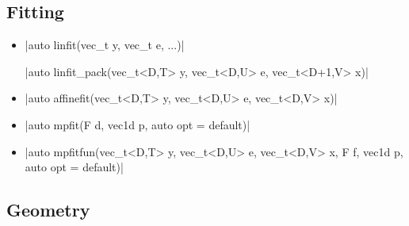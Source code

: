 \documentclass[12pt]{report}
\begin{document}
\subsection{Fitting}

\begin{itemize}
\item \cppinline|auto linfit(vec_t y, vec_t e, ...)| 

\cppinline|auto linfit_pack(vec_t<D,T> y, vec_t<D,U> e, vec_t<D+1,V> x)| 

\item \cppinline|auto affinefit(vec_t<D,T> y, vec_t<D,U> e, vec_t<D,V> x)| 

\item \cppinline|auto mpfit(F d, vec1d p, auto opt = default)| 

\item \cppinline|auto mpfitfun(vec_t<D,T> y, vec_t<D,U> e, vec_t<D,V> x, F f, vec1d p, auto opt = default)| 

\end{itemize}

\subsection{Geometry}
\end{document}
